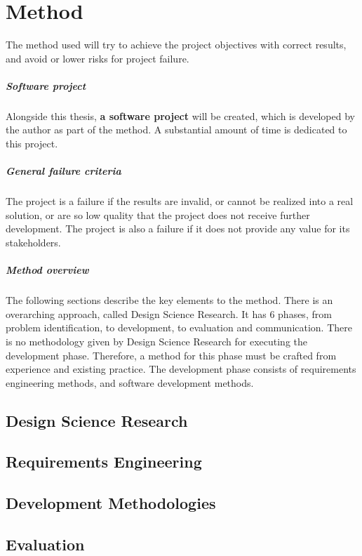 \chapter{Method}\label{chap:method}

The method used will try to achieve the project objectives with correct results, and avoid or lower risks for project failure.

\paragraph{Software project}
Alongside this thesis, \textbf{a software project} will be created, which is developed by the author as part of the method.
A substantial amount of time is dedicated to this project.

\paragraph{General failure criteria}
The project is a failure if the results are invalid, or cannot be realized into a real solution, or are so low quality that the project does not receive further development.
The project is also a failure if it does not provide any value for its stakeholders.

\paragraph{Method overview}
The following sections describe the key elements to the method.
There is an overarching approach, called Design Science Research.
It has 6 phases, from problem identification, to development, to evaluation and communication.
There is no methodology given by Design Science Research for executing the development phase.
Therefore, a method for this phase must be crafted from experience and existing practice.
The development phase consists of requirements engineering methods, and software development methods.


\section{Design Science Research}




\section{Requirements Engineering}




\section{Development Methodologies}



\section{Evaluation}


